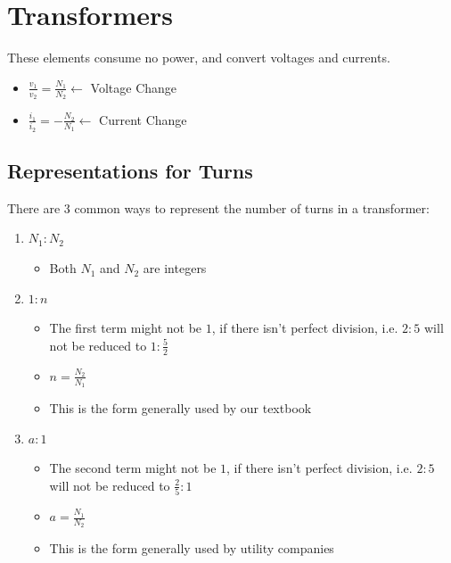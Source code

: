 \documentclass[10pt,letterpaper,final,twoside,notitlepage]{article}
\begin{document}
\section*{Transformers} \label{sec:Transformers}
These elements consume no power, and convert voltages and currents.
\begin{itemize}[noitemsep, nolistsep]
	\item $\frac{v_{1}}{v_{2}} = \frac{N_{1}}{N_{2}} \longleftarrow$ Voltage Change
	\item $\frac{i_{1}}{i_{2}} = -\frac{N_{2}}{N_{1}} \longleftarrow$ Current Change
\end{itemize}
\vspace{-4.75mm}

	\subsection*{Representations for Turns} \label{subsec:Turn Representations}
		There are 3 common ways to represent the number of turns in a transformer:
		\begin{enumerate}
			\item $N_{1} : N_{2}$
			\begin{itemize}[noitemsep, nolistsep]
				\item Both $N_{1}$ and $N_{2}$ are integers
			\end{itemize}
			\item $1 : n$
			\begin{itemize}[noitemsep, nolistsep]
				\item The first term might not be $1$, if there isn't perfect division, i.e. $2 : 5$ will not be reduced to $1 : \frac{5}{2}$
				\item $n = \frac{N_{2}}{N_{1}}$
				\item This is the form generally used by our textbook
			\end{itemize}
			\item $a : 1$
			\begin{itemize}[noitemsep, nolistsep]
				\item The second term might not be $1$, if there isn't perfect division, i.e. $2 : 5$ will not be reduced to $\frac{2}{5} : 1$
				\item $a = \frac{N_{1}}{N_{2}}$
				\item This is the form generally used by utility companies
			\end{itemize}
		\end{enumerate}
		\vspace{-5mm}
		
\end{document}

